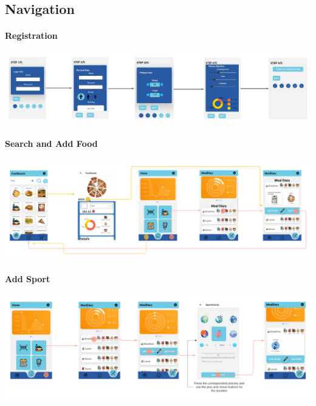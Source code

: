 \documentclass[12pt,hidelinks]{article}
\begin{document}
\subsection{Navigation}

\paragraph{Registration}

\begin{center}
	\includegraphics[scale=0.16]{Registration}
\end{center}

\paragraph{Search and Add Food}

\begin{center}
	\includegraphics[scale=0.108]{Search_Add_Food_UML}
\end{center}

\paragraph{Add Sport}
\begin{center}
	\includegraphics[scale=0.117]{Sport}
\end{center}
\end{document}
